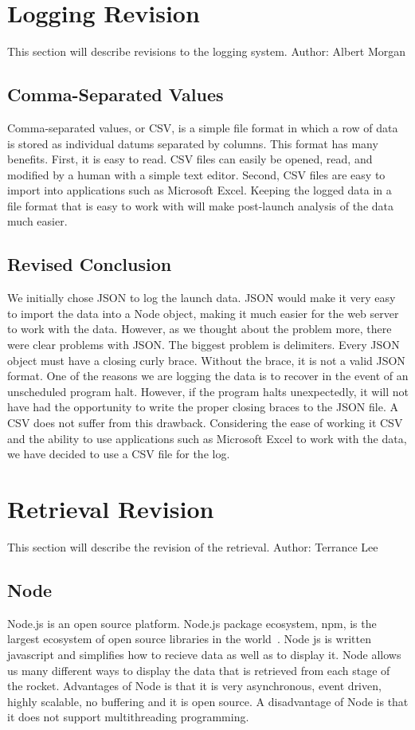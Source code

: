 \documentclass[10pt,draftclsnofoot,onecolumn]{IEEEtran}
\begin{document}
	\section{Logging Revision}
	This section will describe revisions to the logging system. Author: Albert Morgan

	\subsection{Comma-Separated Values}
	Comma-separated values, or CSV, is a simple file format in which a row of data is stored as individual datums separated by columns.
	This format has many benefits.
	First, it is easy to read.
	CSV files can easily be opened, read, and modified by a human with a simple text editor.
	Second, CSV files are easy to import into applications such as Microsoft Excel.
	Keeping the logged data in a file format that is easy to work with will make post-launch analysis of the data much easier.


	\subsection{Revised Conclusion}
	We initially chose JSON to log the launch data.
	JSON would make it very easy to import the data into a Node object,
	making it much easier for the web server to work with the data.
	However, as we thought about the problem more, there were clear problems with JSON.
	The biggest problem is delimiters.
	Every JSON object must have a closing curly brace.
	Without the brace, it is not a valid JSON format.
	One of the reasons we are logging the data is to recover in the event of an unscheduled program halt.
	However, if the program halts unexpectedly, it will not have had the opportunity to write the proper closing braces to the JSON file.
	A CSV does not suffer from this drawback.
	Considering the ease of working it CSV and the ability to use applications such as Microsoft Excel to work with the data,
	we have decided to use a CSV file for the log.

	\section{Retrieval Revision}
	This section will describe the revision of the retrieval.  Author:  Terrance Lee
	\subsection{Node}
   	Node.js is an open source platform.  Node.js package ecosystem, npm, is the largest ecosystem of open source libraries in the 
	world~\cite{node}. Node js is written javascript and simplifies how to recieve data as well as to display it.  Node allows us
	many different ways to display the data that is retrieved from each stage of the rocket.  Advantages of Node is that it is very 
	asynchronous, event driven, highly scalable, no buffering and it is open source.  A disadvantage of Node is that it does not
	support multithreading programming. 
	
\end{document}
